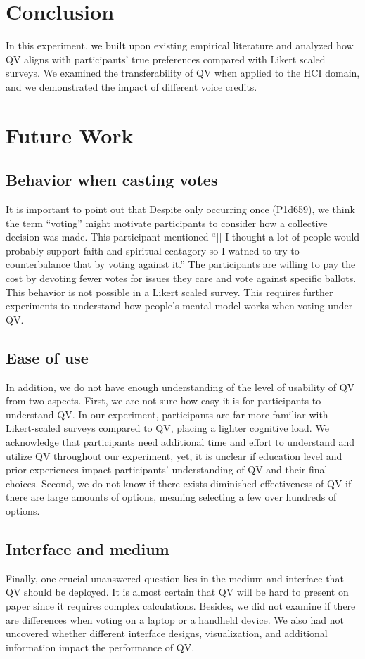 \section{Conclusion} \label{conclusion}
In this experiment, we built upon existing empirical literature
and analyzed how QV aligns with participants' true preferences compared with Likert scaled surveys.
We examined the transferability of QV when applied to the HCI domain, and we demonstrated the impact of different voice credits.


\section{Future Work} \label{future}

\subsection{Behavior when casting votes} %
It is important to point out that Despite only occurring once (P1d659), we think the term ``voting'' might motivate participants to consider how a collective decision was made.
This participant mentioned ``[\textellipsis] I thought a lot of people would probably support faith and spiritual ecatagory  so I watned to try to counterbalance that by voting against it.'' The participants are willing to pay the cost by devoting fewer votes for issues they care and vote against specific ballots. This behavior is not possible in a Likert scaled survey. This requires further experiments to understand how people's mental model works when voting under QV. \par 

\subsection{Ease of use}
In addition, we do not have enough understanding of the level of usability of QV from two aspects.
First, we are not sure how easy it is for participants to understand QV.
In our experiment, participants are far more familiar with Likert-scaled surveys compared to QV, placing a lighter cognitive load.
We acknowledge that participants need additional time and effort to understand and utilize QV throughout our experiment, yet, it is unclear if education level and prior experiences impact participants' understanding of QV and their final choices.
Second, we do not know if there exists diminished effectiveness of QV if there are large amounts of options, meaning selecting a few over hundreds of options.

\subsection{Interface and medium}
Finally, one crucial unanswered question lies in the medium and interface that QV should be deployed.
It is almost certain that QV will be hard to present on paper since it requires complex calculations. 
Besides, we did not examine if there are differences when voting on a laptop or a handheld device.
We also had not uncovered whether different interface designs, visualization, and additional information impact the performance of QV.

